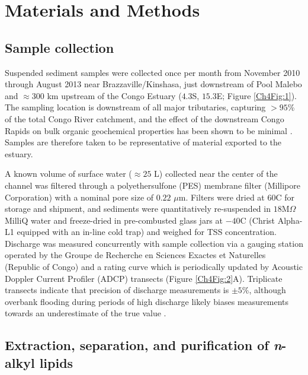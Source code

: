 \section{Materials and Methods}

\subsection{Sample collection}

Suspended sediment samples were collected once per month from November 2010 through August 2013 near Brazzaville/Kinshasa, just downstream of Pool Malebo and $\approx 300$ km upstream of the Congo Estuary ($4.3$\textdegree S, $15.3$\textdegree E; Figure \ref{Ch4Fig:1}). The sampling location is downstream of all major tributaries, capturing $>95$\% of the total Congo River catchment, and the effect of the downstream Congo Rapids on bulk organic geochemical properties has been shown to be minimal \citep{Spencer:2012en}. Samples are therefore taken to be representative of material exported to the estuary.

A known volume of surface water ($\approx 25$ L) collected near the center of the channel was filtered through a polyethersulfone (PES) membrane filter (Millipore Corporation) with a nominal pore size of $0.22$ $\mu$m. Filters were dried at $60$\textdegree C for storage and shipment, and sediments were quantitatively re-suspended in $18$M$\Omega$ MilliQ water and freeze-dried in pre-combusted glass jars at $-40$\textdegree C (Christ Alpha-L1 equipped with an in-line cold trap) and weighed for TSS concentration. Discharge was measured concurrently with sample collection via a gauging station operated by the Groupe de Recherche en Sciences Exactes et Naturelles (Republic of Congo) and a rating curve which is periodically updated by Acoustic Doppler Current Profiler (ADCP) transects (Figure \ref{Ch4Fig:2}A). Triplicate transects indicate that precision of discharge measurements is $\pm 5$\%, although overbank flooding during periods of high discharge likely biases measurements towards an underestimate of the true value \citep{Spencer:2014vp}.

\subsection{Extraction, separation, and purification of \textit{n}-alkyl lipids}

